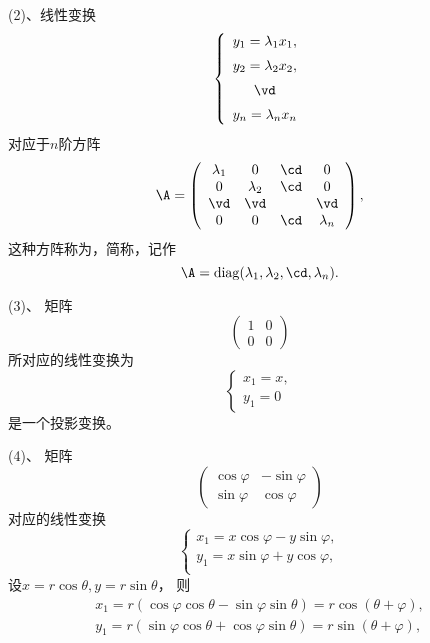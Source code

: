 (2)、线性变换
$$
\left\{
  \begin{array}{c}
    y_1 = \lambda_1 x_1, \\[0.2cm]
    y_2 = \lambda_2 x_2, \\[0.2cm]
    \vd \\[0.2cm]
    y_n = \lambda_n x_n
  \end{array}
\right.
$$  
对应于$n$阶方阵
$$
\A = \left(
  \begin{array}{cccc}
    \lambda_1& 0    & \cd  & 0 \\
    0    & \lambda_2    & \cd  & 0 \\
    \vd  & \vd  &      & \vd \\
    0    & 0    & \cd  & \lambda_n
  \end{array}
\right),
$$
这种方阵称为，简称，记作
$$
\A = \mathrm{diag}(\lambda_1,\lambda_2,\cd,\lambda_n).
$$

(3)、  矩阵
$$
\left(
  \begin{array}{cc}
    1 & 0 \\
    0 & 0 
  \end{array}
\right)
$$ 
所对应的线性变换为
$$
\left\{
  \begin{array}{l}
    x_1 = x, \\[0.2cm]
    y_1 = 0
  \end{array}
\right.
$$
是一个投影变换。 
\begin{figure}[htbp]
  \centering
\end{figure}

(4)、    矩阵
$$
\left(
  \begin{array}{rr}
    \cos \varphi & -\sin \varphi \\
    \sin \varphi &  \cos \varphi 
  \end{array}
\right)
$$  
对应的线性变换
$$
\left \{
  \begin{array}{l}
    x_1 = x \cos \varphi - y \sin \varphi, \\[0.2cm]
    y_1 = x \sin \varphi + y \cos \varphi, \\[0.2cm]
  \end{array}
\right.
$$
设$x=r\cos \theta, y = r\sin \theta$，
则
$$
\begin{array}{l}
  x_1 = r(\cos\varphi \cos\theta - \sin\varphi \sin\theta) = r\cos(\theta+\varphi), \\[0.2cm]
  y_1 = r(\sin\varphi \cos\theta + \cos\varphi \sin\theta) = r\sin(\theta+\varphi), 
\end{array}
$$

